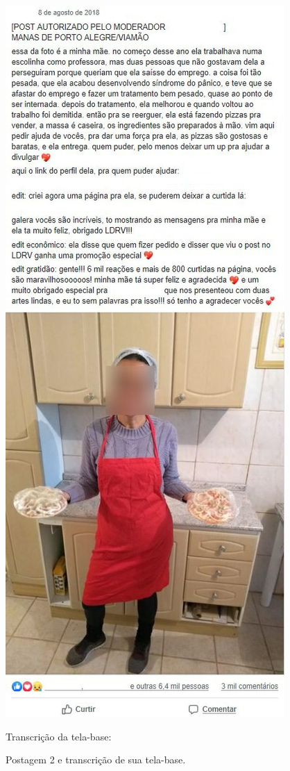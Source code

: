 \documentclass{textolivre}
\begin{document}
\begin{figure}[htbp]
\begin{minipage}{.45\textwidth}
 \includegraphics[width=\textwidth]{fig04.png}
 \caption{Postagem 2 e transcrição de sua tela-base.}
 \label{fig04}
 \end{minipage}\hfill
 \begin{minipage}{0.5\textwidth}
 Transcrição da tela-base:\\
 

\end{minipage}
\end{figure}
\end{document}
